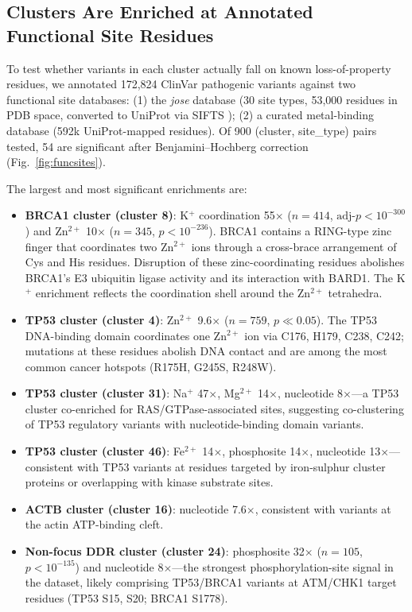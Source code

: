 \documentclass[10pt]{article}
\newcommand{\Zn}{Zn$^{2+}$}
\newcommand{\Mg}{Mg$^{2+}$}
\newcommand{\Na}{Na$^{+}$}
\newcommand{\K}{K$^{+}$}
\newcommand{\Fe}{Fe$^{2+}$}
\begin{document}
\subsection{Clusters Are Enriched at Annotated Functional Site Residues}

To test whether variants in each cluster actually fall on known loss-of-property residues,
we annotated 172,824 ClinVar pathogenic variants against two functional site databases:
(1) the \emph{jose} database (30 site types, 53,000 residues in PDB space, converted to
UniProt via SIFTS \citep{dana2019sifts}); (2) a curated metal-binding database (592k
UniProt-mapped residues). Of 900 (cluster, site\_type) pairs tested, 54 are significant
after Benjamini--Hochberg correction (Fig.~\ref{fig:funcsites}).

The largest and most significant enrichments are:

\begin{itemize}
  \item \textbf{BRCA1 cluster (cluster 8)}: \K{} coordination 55$\times$ ($n = 414$,
    $\text{adj-}p < 10^{-300}$) and \Zn{} 10$\times$ ($n = 345$, $p < 10^{-236}$).
    BRCA1 contains a RING-type zinc finger that coordinates two \Zn{} ions through a
    cross-brace arrangement of Cys and His residues. Disruption of these zinc-coordinating
    residues abolishes BRCA1's E3 ubiquitin ligase activity and its interaction with BARD1.
    The \K{} enrichment reflects the coordination shell around the \Zn{} tetrahedra.
  \item \textbf{TP53 cluster (cluster 4)}: \Zn{} 9.6$\times$ ($n = 759$, $p \ll 0.05$).
    The TP53 DNA-binding domain coordinates one \Zn{} ion via C176, H179, C238, C242;
    mutations at these residues abolish DNA contact and are among the most common cancer
    hotspots (R175H, G245S, R248W).
  \item \textbf{TP53 cluster (cluster 31)}: \Na{} 47$\times$, \Mg{} 14$\times$, nucleotide
    8$\times$---a TP53 cluster co-enriched for RAS/GTPase-associated sites,
    suggesting co-clustering of TP53 regulatory variants with nucleotide-binding domain variants.
  \item \textbf{TP53 cluster (cluster 46)}: \Fe{} 14$\times$, phosphosite 14$\times$,
    nucleotide 13$\times$---consistent with TP53 variants at residues targeted by
    iron-sulphur cluster proteins or overlapping with kinase substrate sites.
  \item \textbf{ACTB cluster (cluster 16)}: nucleotide 7.6$\times$, consistent with
    variants at the actin ATP-binding cleft.
  \item \textbf{Non-focus DDR cluster (cluster 24)}: phosphosite 32$\times$ ($n = 105$,
    $p < 10^{-135}$) and nucleotide 8$\times$---the strongest phosphorylation-site signal
    in the dataset, likely comprising TP53/BRCA1 variants at ATM/CHK1 target residues
    (TP53 S15, S20; BRCA1 S1778).
\end{itemize}
\end{document}
